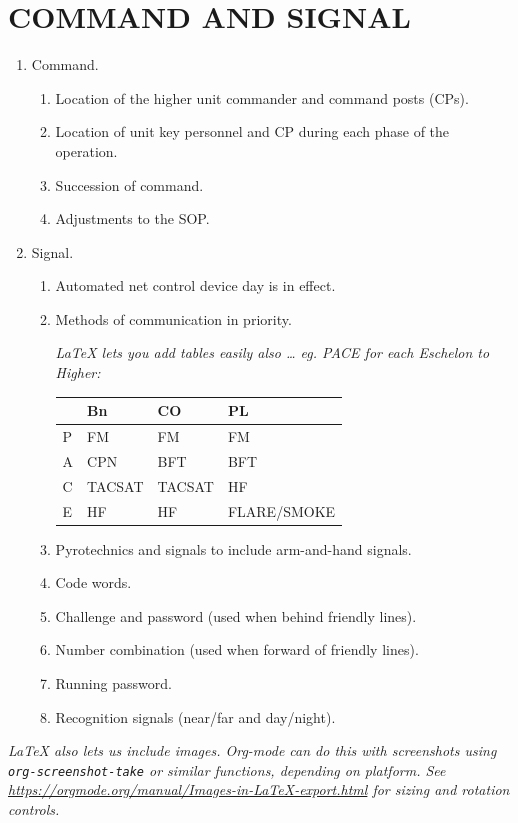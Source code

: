 \documentclass[letterpaper,tgtermes,9pt,microtype,colorlinks=true,urlcolor=blue,DIV=calc,pagesize]{scrartcl}
\begin{document}
\section{\textbf{COMMAND AND SIGNAL}}
\label{sec:org9387c80}
\begin{enumerate}
\item Command.
\begin{enumerate}
\item Location of the higher unit commander and command posts (CPs).
\item Location of unit key personnel and CP during each phase of the operation.
\item Succession of command.
\item Adjustments to the SOP.
\end{enumerate}
\item Signal.
\begin{enumerate}
\item Automated net control device day is in effect.
\item Methods of communication in priority.

\emph{\LaTeX{} lets you add tables easily also \ldots{} eg. PACE for each Eschelon to Higher:}

\begin{tabular}{llll}
 & Bn & CO & PL\\
\hline
P & FM & FM & FM\\
A & CPN & BFT & BFT\\
C & TACSAT & TACSAT & HF\\
E & HF & HF & FLARE/SMOKE\\
\end{tabular}
\item Pyrotechnics and signals to include arm-and-hand signals.
\item Code words.
\item Challenge and password (used when behind friendly lines).
\item Number combination (used when forward of friendly lines).
\item Running password.
\item Recognition signals (near/far and day/night).
\end{enumerate}
\end{enumerate}

\clearpage

\emph{\LaTeX{} also lets us include images. Org-mode can do this with screenshots
using \texttt{org-screenshot-take} or similar functions, depending on platform. See \url{https://orgmode.org/manual/Images-in-LaTeX-export.html} for sizing and rotation controls.}
\end{document}
